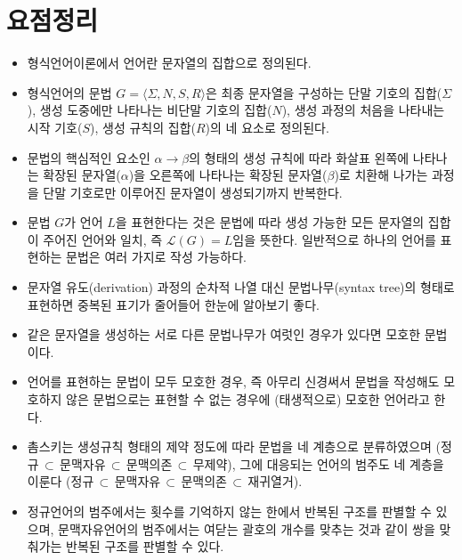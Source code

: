 \section*{요점정리}
\begin{itemize}
    \item 형식언어이론에서 언어란 문자열의 집합으로 정의된다.
    \item 형식언어의 문법 $G=\langle\Sigma,N,S,R\rangle$은
    최종 문자열을 구성하는 단말 기호의 집합($\Sigma$),
    생성 도중에만 나타나는 비단말 기호의 집합($N$),
    생성 과정의 처음을 나타내는 시작 기호($S$),
    생성 규칙의 집합($R$)의 네 요소로 정의된다.
    \item 문법의 핵심적인 요소인 $\alpha\to\beta$의 형태의 생성 규칙에 따라
    화살표 왼쪽에 나타나는 확장된 문자열($\alpha$)을 오른쪽에 나타나는
    확장된 문자열($\beta$)로 치환해 나가는 과정을 단말 기호로만 이루어진
    문자열이 생성되기까지 반복한다.
    \item 문법 $G$가 언어 $L$을 표현한다는 것은 문법에 따라 생성 가능한 모든
    문자열의 집합이 주어진 언어와 일치, 즉 $\mathcal{L}(G) = L$임을 뜻한다.
    일반적으로 하나의 언어를 표현하는 문법은 여러 가지로 작성 가능하다.
    \item 문자열 유도(derivation) 과정의 순차적 나열 대신
    문법나무(syntax tree)의 형태로 표현하면 중복된 표기가 줄어들어
    한눈에 알아보기 좋다.
    \item 같은 문자열을 생성하는 서로 다른 문법나무가 여럿인 경우가
    있다면 모호한 문법이다.
    \item 언어를 표현하는 문법이 모두 모호한 경우, 즉 아무리 신경써서
    문법을 작성해도 모호하지 않은 문법으로는 표현할 수 없는 경우에
    (태생적으로) 모호한 언어라고 한다.
    \item 촘스키는 생성규칙 형태의 제약 정도에 따라 문법을 네 계층으로 분류하였으며
    (정규$\,\subset\,$문맥자유$\,\subset\,$문맥의존$\,\subset\,$무제약),
    그에 대응되는 언어의 범주도 네 계층을 이룬다
    (정규$\,\subset\,$문맥자유$\,\subset\,$문맥의존$\,\subset\,$재귀열거).
    \item 정규언어의 범주에서는 횟수를 기억하지 않는 한에서 반복된 구조를
    판별할 수 있으며, 문맥자유언어의 범주에서는 여닫는 괄호의 개수를 맞추는
    것과 같이 쌍을 맞춰가는 반복된 구조를 판별할 수 있다.
\end{itemize}

